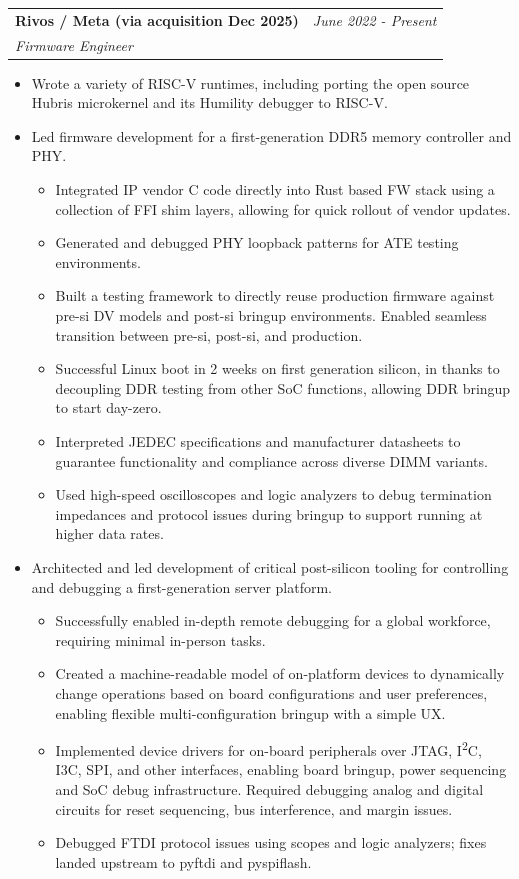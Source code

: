 \documentclass[letterpaper,12pt]{article}
\makeatletter
\newcommand{\resumeSubHeading}[4]{
  \vspace{-1pt}\item
    \begin{tabular*}{0.97\textwidth}[t]{l@{\extracolsep{\fill}}r}
      \textbf{#1} & \textit{#2} \\%
      \textit{\small #3} & \textit{\small #4} \\
    \end{tabular*}\vspace{-4pt}
}
\newcommand{\resumeItemListStart}{\begin{itemize}[itemsep=1pt,parsep=0pt,topsep=1pt]}
\newcommand{\resumeItemListEnd}{\end{itemize}\vspace{-0pt}}
\newcommand{\resumeItem}[1]{
  \item\small{{#1}}
}
\makeatother
\begin{document}
    \resumeSubHeading
      {Rivos / Meta \small\textmd{(via acquisition Dec 2025)}}{June 2022 - Present}
      {Firmware Engineer}{}
      \resumeItemListStart
        \resumeItem{Wrote a variety of RISC-V runtimes, including porting the open source Hubris \href{https://github.com/rivosinc/hubris}{\faLink[regular]} microkernel and its Humility \href{https://github.com/rivosinc/humility}{\faLink} debugger to RISC-V.}
        \resumeItem{Led firmware development for a first-generation DDR5 memory controller and PHY.}
        \resumeItemListStart
          \resumeItem{Integrated IP vendor C code directly into Rust based FW stack using a collection of FFI shim layers, allowing for quick rollout of vendor updates.}
          \resumeItem{Generated and debugged PHY loopback patterns for ATE testing environments.}
          \resumeItem{Built a testing framework to directly reuse production firmware against pre-si DV models and post-si bringup environments. Enabled seamless transition between pre-si, post-si, and production.}
          \resumeItem{Successful Linux boot in 2 weeks on first generation silicon, in thanks to decoupling DDR testing from other SoC functions, allowing DDR bringup to start day-zero.}
          \resumeItem{Interpreted JEDEC specifications and manufacturer datasheets to guarantee functionality and compliance across diverse DIMM variants.}
          \resumeItem{Used high-speed oscilloscopes and logic analyzers to debug termination impedances and protocol issues during bringup to support running at higher data rates.}
        \resumeItemListEnd
        \resumeItem{Architected and led development of critical post-silicon tooling for controlling and debugging a first-generation server platform.}
        \resumeItemListStart
          \resumeItem{Successfully enabled in-depth remote debugging for a global workforce, requiring minimal in-person tasks.}
          \resumeItem{Created a machine-readable model of on-platform devices to dynamically change operations based on board configurations and user preferences, enabling flexible multi-configuration bringup with a simple UX.}
          \resumeItem{Implemented device drivers for on-board peripherals over JTAG, I\textsuperscript{2}C, I3C, SPI, and other interfaces, enabling board bringup, power sequencing and SoC debug infrastructure.  Required debugging analog and digital circuits for reset sequencing, bus interference, and margin issues.}
          \resumeItem{Debugged FTDI protocol issues using scopes and logic analyzers; fixes landed upstream to pyftdi and pyspiflash.}
        \resumeItemListEnd
      \resumeItemListEnd
      
\end{document}
